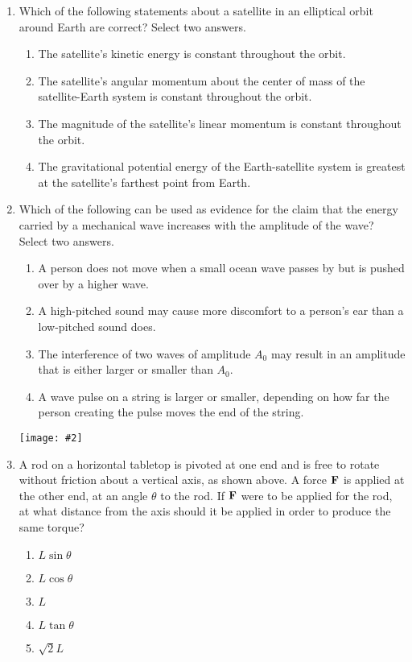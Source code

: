 \documentclass[11pt]{article}
\newcommand{\pic}[2]{\texttt{[image: \#2]}}
\newcommand{\mb}[1]{\ensuremath\mathbf{#1}}
\begin{document}
\begin{multicols}{2}
\begin{enumerate}[leftmargin=18pt,resume]
  \item Which of the following statements about a satellite in an elliptical
    orbit around Earth are correct? Select two answers.
    \begin{enumerate}[nosep,leftmargin=18pt,label=(\Alph*)]
    \item The satellite's kinetic energy is constant throughout the orbit.
    \item The satellite's angular momentum about the center of mass of the
      satellite-Earth system is constant throughout the orbit.
    \item The magnitude of the satellite's linear momentum is constant
      throughout the orbit.
    \item The gravitational potential energy of the Earth-satellite system is
      greatest at the satellite's farthest point from Earth.
    \end{enumerate}
    \vspace{.7in}
    
  \item Which of the following can be used as evidence for the claim that the
    energy carried by a mechanical wave increases with the amplitude of the
    wave? Select two answers.
    \begin{enumerate}[nosep,leftmargin=18pt,label=(\Alph*)]
    \item A person does not move when a small ocean wave passes by but is pushed
      over by a higher wave.
    \item A high-pitched sound may cause more discomfort to a person's ear than
      a low-pitched sound does.
    \item The interference of two waves of amplitude $A_0$ may result in an
      amplitude that is either larger or smaller than $A_0$.
    \item A wave pulse on a string is larger or smaller, depending on how far
      the person creating the pulse moves the end of the string.
    \end{enumerate}
    \vspace{.7in}
    
    \begin{center}
      \pic{.35}{rod}
    \end{center}
  \item A rod on a horizontal tabletop is pivoted at one end and is free to
    rotate without friction about a vertical axis, as shown above. A force
    $\mb{F}$ is applied at the other end, at an angle $\theta$ to the rod. If
    $\mb{F}$ were to be applied for the rod, at what distance from the axis
    should it be applied in order to produce the same torque?
    \begin{enumerate}[nosep,leftmargin=18pt,label=(\Alph*)]
    \item$L\sin\theta$
    \item$L\cos\theta$
    \item$L$
    \item$L\tan\theta$
    \item$\sqrt{2}L$
    \end{enumerate}
    \columnbreak
    

\end{enumerate}
\end{multicols}
\end{document}
